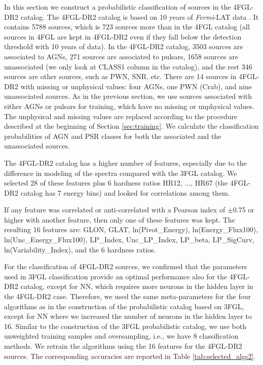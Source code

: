 \documentclass{aa}
\newcommand{\Fermi}{\textit{Fermi}\xspace}
\begin{document}
In this section we construct a probabilistic classification of sources in the 4FGL-DR2 catalog. The 4FGL-DR2 catalog \citep{2020arXiv200511208B} 
is based on 10 years of \Fermi-LAT data \citep[compared to 8 years of data in the 4FGL catalog,][]{2020ApJS..247...33A}.
It contains 5788 sources, which is 723 sources more than in the 4FGL catalog (all sources in 4FGL are kept in 4FGL-DR2 even if they fall
below the detection threshold with 10 years of data). 
In the 4FGL-DR2 catalog,
3503 sources are associated to AGNs,
271 sources are associated to pulsars,
1658 sources are unassociated (we only look at CLASS1 column in the catalog), 
and the rest 346 sources are other sources, such as PWN, SNR, etc.
There are 14 sources in 4FGL-DR2 with missing or unphysical values: four AGNs, one PWN (Crab), and nine unassociated sources.
As in the previous section, we use sources associated with either AGNs or pulsars for training,
which have no missing or unphysical values.
The unphysical and missing values are replaced according to the procedure described at the beginning of Section \ref{sec:training}.
We calculate the classification probabilities of AGN and PSR classes for both the associated and the unassociated sources.

The 4FGL-DR2 catalog has a higher number of features, especially due to the difference in modeling of the spectra compared with the 3FGL catalog. 
We selected 28 of these features plus 6 hardness ratios HR12, ..., HR67 (the 4FGL-DR2 catalog has 7 energy bins)
and looked for correlations among them. 

If any feature was correlated or anti-correlated with a Pearson index of $\pm$0.75 or higher with another feature, then only one of these features was kept. 
The resulting 16 features are:
GLON, GLAT, ln(Pivot\_Energy), ln(Energy\_Flux100), ln(Unc\_Energy\_Flux100), LP\_Index, Unc\_LP\_Index, LP\_beta, LP\_SigCurv, ln(Variability\_Index), and the 6 hardness ratios.

For the classification of 4FGL-DR2 sources, we confirmed that the parameters used in 3FGL classification provide an optimal performance also for the 4FGL-DR2 catalog, except for NN, which requires more neurons in the hidden layer in the 4FGL-DR2 case.
Therefore, we used the same meta-parameters for the four algorithms as in the construction of the probabilistic catalog based on 3FGL, except for NN where we increased the number of neurons in the hidden layer to 16. Similar to the construction of the 3FGL probabilistic catalog, we use both unweighted training samples and oversampling, i.e., we have 8 classification methods.
We retrain the algorithms using the 16 features for the 4FGL-DR2 sources.
The corresponding accuracies are reported in Table \ref{tab:selected_algs2}.
\end{document}
